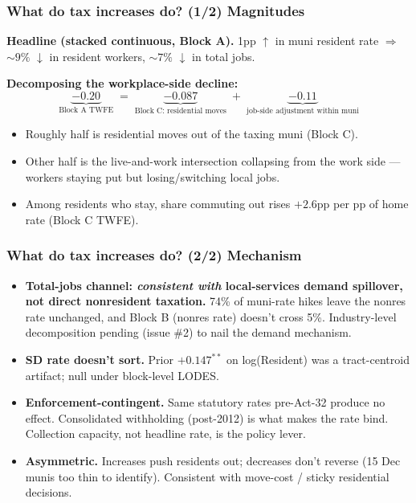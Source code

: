 \documentclass[xcolor = x11names, compress, aspectratio = 169]{beamer}
\renewcommand{\(}{\begin{columns}}
\renewcommand{\)}{\end{columns}}
\newcommand{\<}[1]{\begin{column}{#1}}
\renewcommand{\>}{\end{column}}
\begin{document}
\begin{frame}
\frametitle{What do tax increases do? (1/2) Magnitudes}
    \footnotesize
    \textbf{Headline (stacked continuous, Block A).}
    1pp $\uparrow$ in muni resident rate $\Rightarrow$
    $\sim 9\%$ $\downarrow$ in resident workers, $\sim 7\%$ $\downarrow$ in total jobs.
    \medskip

    \textbf{Decomposing the workplace-side decline:}
    \scriptsize
    \[
    \underbrace{-0.20}_{\text{Block A TWFE}}
    \;=\;
    \underbrace{-0.087}_{\text{Block C: residential moves}}
    \;+\;
    \underbrace{-0.11}_{\text{job-side adjustment within muni}}
    \]
    \footnotesize
    \begin{itemize}\setlength{\itemsep}{0.04cm}\scriptsize
        \item Roughly half is residential moves out of the taxing muni (Block C).
        \item Other half is the live-and-work intersection collapsing from the
        work side --- workers staying put but losing/switching local jobs.
        \item Among residents who stay, share commuting out rises $+2.6$pp
        per pp of home rate (Block C TWFE).
    \end{itemize}
\end{frame}

\begin{frame}
\frametitle{What do tax increases do? (2/2) Mechanism}
    \footnotesize
    \begin{itemize}\setlength{\itemsep}{0.10cm}\footnotesize
        \item \textbf{Total-jobs channel: \emph{consistent with} local-services
        demand spillover, not direct nonresident taxation.}
        74\% of muni-rate hikes leave the nonres rate unchanged, and Block B
        (nonres rate) doesn't cross 5\%. Industry-level decomposition
        pending (issue \#2) to nail the demand mechanism.
        \item \textbf{SD rate doesn't sort.} Prior $+0.147^{**}$ on
        log(Resident) was a tract-centroid artifact; null under block-level LODES.
        \item \textbf{Enforcement-contingent.} Same statutory rates pre-Act-32
        produce no effect. Consolidated withholding (post-2012) is what makes
        the rate bind. Collection capacity, not headline rate, is the policy lever.
        \item \textbf{Asymmetric.} Increases push residents out; decreases
        don't reverse (15 Dec munis too thin to identify). Consistent with
        move-cost / sticky residential decisions.
    \end{itemize}
\end{frame}
\end{document}
